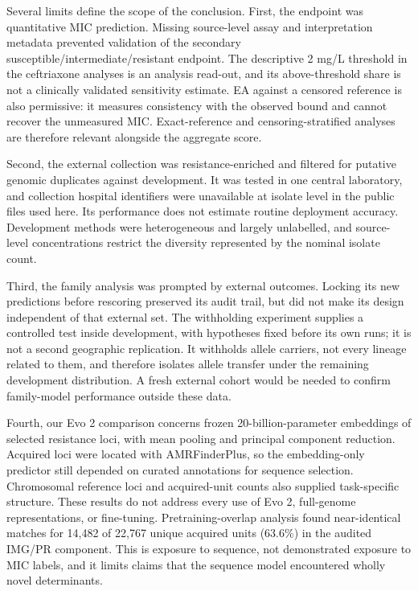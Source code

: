\documentclass[
  american,
  11pt,
]{article}
\begin{document}
Several limits define the scope of the conclusion. First, the endpoint
was quantitative MIC prediction. Missing source-level assay and
interpretation metadata prevented validation of the secondary
susceptible/intermediate/resistant endpoint. The descriptive 2 mg/L
threshold in the ceftriaxone analyses is an analysis read-out, and its
above-threshold share is not a clinically validated sensitivity
estimate. EA against a censored reference is also permissive: it
measures consistency with the observed bound and cannot recover the
unmeasured MIC. Exact-reference and censoring-stratified analyses are
therefore relevant alongside the aggregate score.

Second, the external collection was resistance-enriched and filtered for
putative genomic duplicates against development. It was tested in one
central laboratory, and collection hospital identifiers were unavailable
at isolate level in the public files used here. Its performance does not
estimate routine deployment accuracy. Development methods were
heterogeneous and largely unlabelled, and source-level concentrations
restrict the diversity represented by the nominal isolate count.

Third, the family analysis was prompted by external outcomes. Locking
its new predictions before rescoring preserved its audit trail, but did
not make its design independent of that external set. The withholding
experiment supplies a controlled test inside development, with
hypotheses fixed before its own runs; it is not a second geographic
replication. It withholds allele carriers, not every lineage related to
them, and therefore isolates allele transfer under the remaining
development distribution. A fresh external cohort would be needed to
confirm family-model performance outside these data.

Fourth, our Evo 2 comparison concerns frozen 20-billion-parameter
embeddings of selected resistance loci, with mean pooling and principal
component reduction. Acquired loci were located with AMRFinderPlus, so
the embedding-only predictor still depended on curated annotations for
sequence selection. Chromosomal reference loci and acquired-unit counts
also supplied task-specific structure. These results do not address
every use of Evo 2, full-genome representations, or fine-tuning.
Pretraining-overlap analysis found near-identical matches for 14,482 of
22,767 unique acquired units (63.6\%) in the audited IMG/PR component.
This is exposure to sequence, not demonstrated exposure to MIC labels,
and it limits claims that the sequence model encountered wholly novel
determinants.
\end{document}
